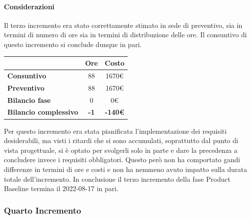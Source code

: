 \paragraph{Considerazioni} \hfill \break
Il terzo incremento era stato correttamente stimato in sede di preventivo, sia in termini di numero di ore sia 
in termini di distribuzione delle ore. Il consuntivo di questo incremento si conclude dunque in pari.
\begin{center}
	\renewcommand{\arraystretch}{1.8}
	\begin{tabular}{ | l |c|c| }
    \hline
    & \textbf{Ore} & \textbf{Costo} \\
	\hline
    \textbf{Consuntivo} & 88 & 1670\euro \\
    \hline
    \textbf{Preventivo} & 88 & 1670\euro \\
    \hline
    \textbf{Bilancio fase} & 0 & 0\euro \\
    \hline
    \textbf{Bilancio complessivo} & \textbf{-1} & \textbf{-140\euro} \\
    \hline
    \end{tabular}
\end{center}
Per questo incremento era stata pianificata l'implementazione dei requisiti desiderabili, ma visti i ritardi che si sono accumulati, soprattutto dal punto di vista progettuale, si è optato per svolgerli solo in parte e dare la precedenza a concludere invece i requisiti obbligatori. Questo però non ha comportato gandi differenze in termini di ore e costi e non ha nemmeno avuto impatto sulla durata totale dell'incremento.
In conclusione il terzo incremento della fase Product Baseline termina il 2022-08-17 in pari.
\newpage

\subsubsection{Quarto Incremento}

